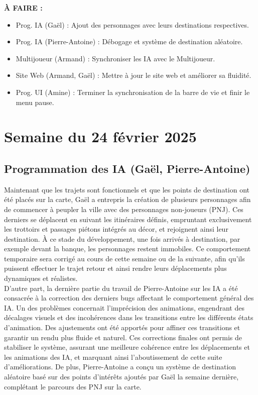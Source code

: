 \documentclass{report}
\begin{document}
\textbf{À FAIRE :}
\begin{itemize}
    \item Prog. IA (Gaël) : Ajout des personnages avec leurs destinations respectives.
    \item Prog. IA (Pierre-Antoine) : Débogage et système de destination aléatoire.
    \item Multijoueur (Armand) : Synchroniser les IA avec le Multijoueur.
    \item Site Web (Armand, Gaël) : Mettre à jour le site web et améliorer sa fluidité.
    \item Prog. UI (Amine) : Terminer la synchronisation de la barre de vie et finir le menu pause.
\end{itemize}







\newpage
\section{Semaine du 24 février 2025}

\subsection*{Programmation des IA (Gaël, Pierre-Antoine)}
Maintenant que les trajets sont fonctionnels et que les points de destination ont été placés sur la carte, Gaël a entrepris la création de plusieurs personnages afin de commencer à peupler la ville avec des personnages non-joueurs (PNJ). Ces derniers se déplacent en suivant les itinéraires définis, empruntant exclusivement les trottoirs et passages piétons intégrés au décor, et rejoignent ainsi leur destination. À ce stade du développement, une fois arrivés à destination, par exemple devant la banque, les personnages restent immobiles. Ce comportement temporaire sera corrigé au cours de cette semaine ou de la suivante, afin qu’ils puissent effectuer le trajet retour et ainsi rendre leurs déplacements plus dynamiques et réalistes.
\\[0.4cm]
D'autre part, la dernière partie du travail de Pierre-Antoine sur les IA a été consacrée à la correction des derniers bugs affectant le comportement général des IA. Un des problèmes concernait l’imprécision des animations, engendrant des décalages visuels et des incohérences dans les transitions entre les différents états d’animation. Des ajustements ont été apportés pour affiner ces transitions et garantir un rendu plus fluide et naturel. Ces corrections finales ont permis de stabiliser le système, assurant une meilleure cohérence entre les déplacements et les animations des IA, et marquant ainsi l’aboutissement de cette suite d’améliorations. De plus, Pierre-Antoine a conçu un système de destination aléatoire basé sur des points d’intérêts ajoutés par Gaël la semaine dernière, complétant le parcours des PNJ sur la carte.
\end{document}
